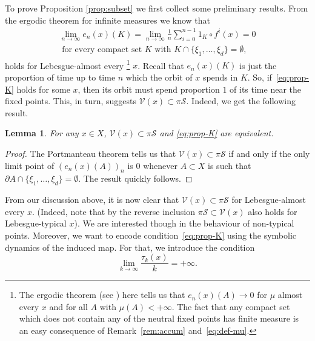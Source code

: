 \documentclass[english, 10pt]{amsart}
\numberwithin{equation}{section}
\theoremstyle{definition}
\theoremstyle{plain}
\newtheorem{lemma}[definition]{Lemma}
\theoremstyle{plain}
\theoremstyle{definition}
\theoremstyle{definition}
\theoremstyle{plain}
\theoremstyle{definition}
\newcommand{\cV}{{\mathcal V}}
\newcommand{\cS}{{\mathcal S}}
\numberwithin{equation}{section}
\begin{document}
To prove Proposition \ref{prop:subset} we first collect some preliminary results.
From the ergodic theorem for infinite measures  we know that
\begin{equation}
\begin{gathered}\label{eq:prop-K}
  \lim_{n\to\infty} e_n (x) (K) 
  = \lim_{n\to\infty} \frac{1}{n} \sum_{ i =  0 }^{ n - 1 } 1_{K} \circ f^i (x) = 0\\
  \text{ for every compact set } K \text{ with } K \cap \{ \xi_1, \ldots, \xi_d \} = \emptyset,
  \end{gathered}
\end{equation}
holds for Lebesgue-almost every%
\footnote{The ergodic theorem  (see \cite[Exercise 2.2.1]{Aar:1997}) here tells us that $e_n(x)(A) \to 0$  for $\mu$ almost every $x$ and for all $A$ with $\mu (A) < +\infty$. The fact that any compact set which does not contain any of the neutral fixed points has finite measure is an easy consequence of Remark~\ref{rem:accum} and~\eqref{eq:def-mu}.} $x$.
Recall that $e_n(x)(K)$ is just the proportion of time  up to time $n$ which the orbit of $x$ spends in $K$. So, if~\eqref{eq:prop-K} holds for some $x$, then its orbit must spend proportion $1$ of its time near the fixed points. This, in turn, suggests $\cV(x) \subset \pi\cS$. Indeed, we get the following result.

\begin{lemma}
  \label{lem:limit-points}
  For any $x\in X$, $\cV(x) \subset \pi\cS$ and \eqref{eq:prop-K} are equivalent.
\end{lemma}

\begin{proof}
  The Portmanteau theorem tells us that $\cV(x) \subset \pi\cS$ if and only if the only limit point of $(e_n(x)(A))_n$ is $0$ whenever $A\subset X$ is
  such that $ \partial A \cap \{ \xi_1 , \ldots, \xi_d\} = \emptyset$. The result quickly follows.
\end{proof}

From our discussion above, it is now clear that $\cV(x) \subset \pi \cS$ for Lebesgue-almost every $x$. (Indeed, note that by \cite{CoaMelTal:2024} the reverse inclusion $\pi\mathcal{S}\subset \mathcal{V}(x)$ also holds for Lebesgue-typical $x$).
We are interested though in the behaviour of non-typical points. Moreover, we want to encode condition~\eqref{eq:prop-K} using the symbolic dynamics of the induced map.  
For that, we introduce the condition
\begin{equation}\label{eq:birk-tau}
  \lim_{ k \to \infty } \frac{ \tau_k (x) }{ k } = +\infty.
\end{equation}
\end{document}

